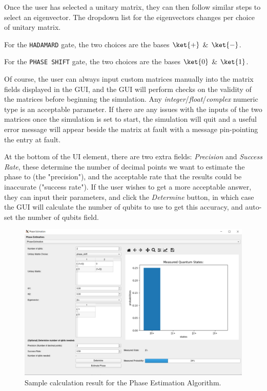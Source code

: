 \documentclass{article}
\begin{document}
\medskip

Once the user has selected a unitary matrix, they can then follow similar steps to select an eigenvector.
The dropdown list for the eigenvectors changes per choice of unitary matrix.

\medskip

For the \verb#HADAMARD# gate, the two choices are the bases $\ket{+}$ & $\ket{-}$.

\medskip

For the \verb#PHASE SHIFT# gate, the two choices are the bases $\ket{0}$ & $\ket{1}$.

\medskip

Of course, the user can always input custom matrices manually into the matrix fields displayed in the GUI, and the GUI will perform checks on the validity of the matrices before beginning the simulation.
Any \textit{integer}/\textit{float}/\textit{complex} numeric type is an acceptable parameter.
If there are any issues with the inputs of the two matrices once the simulation is set to start, the simulation will quit and a useful error message will appear beside the matrix at fault with a message pin-pointing the entry at fault.

\medskip

At the bottom of the UI element, there are two extra fields:
\textit{Precision} and \textit{Success Rate}, these determine the number of decimal points we want to estimate the phase to (the "precision"), and the acceptable rate that the results could be inaccurate ("success rate").
If the user wishes to get a more acceptable answer, they can input their parameters, and click the \textit{Determine} button, in which case the GUI will calculate the number of qubits to use to get this accuracy, and auto-set the number of qubits field.

\begin{figure}[H]
\includegraphics[width=15cm]{docs/images/gui_calculation_phase_estimation.png}
\caption{\label{gui-calculation-phase} Sample calculation result for the Phase Estimation Algorithm.}
\end{figure}
\end{document}
